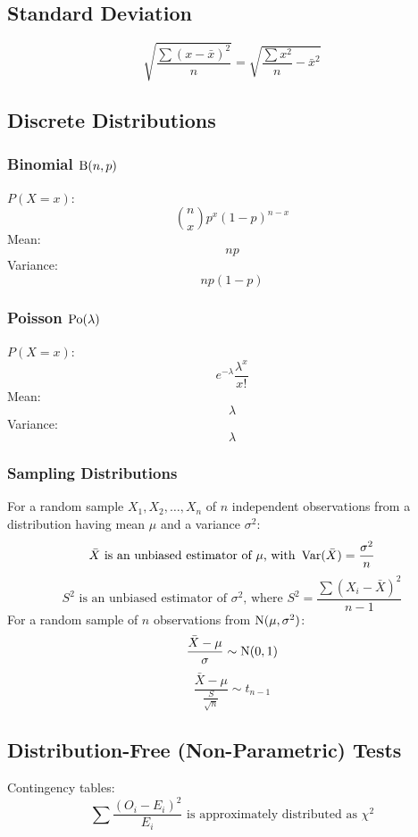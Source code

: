 \subsection{Standard Deviation}
\begin{equation}
    \sqrt{\frac{\sum(x-\bar{x})^2}{n}}=\sqrt{\frac{\sum x^2}{n}-\bar{x}^2}
\end{equation}

\subsection{Discrete Distributions}
\subsubsection{Binomial $\operatorname{B}(n,p)$}
$P(X=x)$:
\begin{equation}
    \binom{n}{x}p^x(1-p)^{n-x}
\end{equation}
Mean:
\begin{equation}
    np
\end{equation}
Variance:
\begin{equation}
    np(1-p)
\end{equation}

\subsubsection{Poisson $\operatorname{Po}(\lambda)$}
$P(X=x):$
\begin{equation}
    e^{-\lambda}\frac{\lambda^x}{x!}
\end{equation}
Mean:
\begin{equation}
    \lambda
\end{equation}
Variance:
\begin{equation}
    \lambda
\end{equation}

\subsubsection{Sampling Distributions}
For a random sample $X_1,X_2,\dots,X_n$ of $n$ independent observations from a distribution having mean $\mu$ and a variance $\sigma^2$:
\begin{equation}
    \bar{X}\text{ is an unbiased estimator of }\mu\text{, with }\operatorname{Var}(\bar{X})=\frac{\sigma^2}{n}
\end{equation}
\begin{equation}
    S^2\text{ is an unbiased estimator of }\sigma^2\text{, where }S^2=\frac{\sum(X_i-\bar{X})^2}{n-1}
\end{equation}
For a random sample of $n$ observations from $\operatorname{N}(\mu,\sigma^2)$:
\begin{equation}
    \frac{\bar{X}-\mu}{\sigma}\sim\operatorname{N}(0,1)
\end{equation}
\begin{equation}
    \frac{\bar{X}-\mu}{\frac{S}{\sqrt{n}}}\sim t_{n-1}
\end{equation}

\subsection{Distribution-Free (Non-Parametric) Tests}
Contingency tables:
\begin{equation}
    \sum \frac{(O_i-E_i)^2}{E_i}\text{ is approximately distributed as }\chi^2
\end{equation}
\newpage